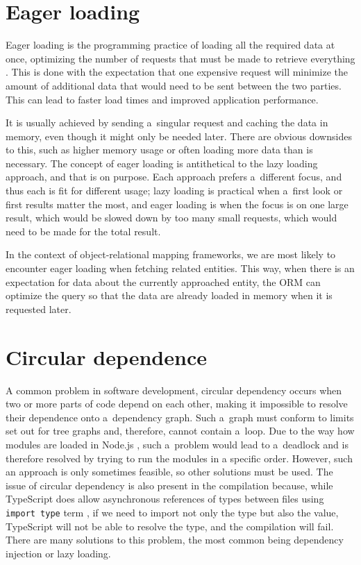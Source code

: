 \section*{Eager loading}
Eager loading is the programming practice of loading all the required data at
once, optimizing the number of requests that must be made to retrieve everything
\cite{sequelize-eager-loading}. This is done with the expectation that one
expensive request will minimize the amount of additional data that would need to
be sent between the two parties. This can lead to faster load times and improved
application performance.

It is usually achieved by sending a~singular request and caching the data in
memory, even though it might only be needed later. There are obvious downsides
to this, such as higher memory usage or often loading more data than is
necessary. The concept of eager loading is antithetical to the lazy loading
approach, and that is on purpose. Each approach prefers a~different focus, and
thus each is fit for different usage; lazy loading is practical when a~first
look or first results matter the most, and eager loading is when the focus is on
one large result, which would be slowed down by too many small requests, which
would need to be made for the total result.

In the context of object-relational mapping frameworks, we are most likely to
encounter eager loading when fetching related entities. This way, when there is
an expectation for data about the currently approached entity, the ORM can
optimize the query so that the data are already loaded in memory when it is
requested later.


\section*{Circular dependence}
A common problem in software development, circular dependency occurs when two or
more parts of code depend on each other, making it impossible to resolve their
dependence onto a~dependency graph. Such a~graph must conform to limits set out
for tree graphs and, therefore, cannot contain a~loop. Due to the way how
modules are loaded in Node.js \cite{commonjsModulesNode}, such a~problem would
lead to a~deadlock and is therefore resolved by trying to run the modules in a
specific order. However, such an approach is only sometimes feasible, so other
solutions must be used. The issue of circular dependency is also present in the
compilation because, while TypeScript does allow asynchronous references of
types between files using \texttt{import type} term \cite{typescript-modules},
if we need to import not only the type but also the value, TypeScript will not
be able to resolve the type, and the compilation will fail. There are many
solutions to this problem, the most common being dependency injection or lazy
loading.

